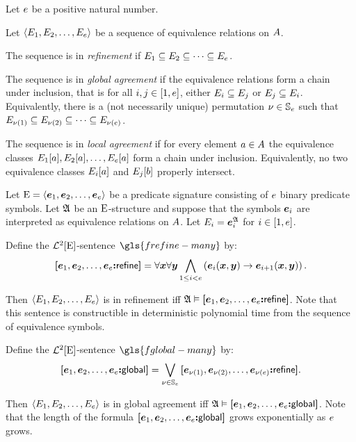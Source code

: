 Let $e$ be a positive natural number.
\begin{definition}
Let $\left\langle E_{1}, E_{2}, \dots, E_{e} \right\rangle$ be a sequence of equivalence
relations on $A$.

The sequence is in \emph{refinement} if $E_{1} \subseteq E_{2} \subseteq
\dots \subseteq E_{e}$.

The sequence is in \emph{global agreement} if the equivalence relations form a
chain under inclusion, that is for all $i, j \in [1, e]$,
either $E_{i} \subseteq E_{j}$ or $E_{j} \subseteq E_{i}$.
Equivalently, there is a (not necessarily unique) permutation
$\nu \in \mathbb{S}_{e}$ such that
$E_{\nu(1)} \subseteq E_{\nu(2)} \subseteq \dots \subseteq
E_{\nu(e)}$.

The sequence is in \emph{local agreement} if for every element $a \in A$
the equivalence classes $E_{1}[a], E_{2}[a], \dots, E_{e}[a]$
form a chain under inclusion.
Equivalently, no two equivalence classes $E_{i}[a]$ and $E_{j}[b]$
properly intersect.
\end{definition}

Let ${\mathrm{E}} = \left\langle \bm{e}_{1}, \bm{e}_{2}, \dots, \bm{e}_{e} \right\rangle$ be a predicate signature
consisting of $e$ binary predicate symbols.
Let $\mathfrak{A}$ be an ${\mathrm{E}}$-structure and suppose that the symbols $\bm{e}_{i}$ are
interpreted as equivalence relations on $A$. Let 
$E_{i} = \bm{e}_{i}^{\mathfrak{A}}$ for $i \in [1,e]$.
\begin{definition}
Define the $\mathcal{L}^{2}[{\mathrm{E}}]$-sentence $\gls{frefine-many}$ by:
\[
  {\bm{[}\bm{e}_{1},\bm{e}_{2},\dots,\bm{e}_{e}\mathord{\bm{:}}\mathsf{refine}\bm{]}} =
  \forall\bm{x}\forall\bm{y} \bigwedge_{1 \leq i < e}
  \left(\bm{e}_{i}(\bm{x},\bm{y}) \rightarrow \bm{e}_{i+1}(\bm{x},\bm{y})\right).
\]
\end{definition}
Then $\left\langle E_{1},E_{2},\dots,E_{e} \right\rangle$ is in refinement iff
$\mathfrak{A} \vDash {\bm{[}\bm{e}_{1},\bm{e}_{2},\dots,\bm{e}_{e}\mathord{\bm{:}}\mathsf{refine}\bm{]}}$.
Note that this sentence is constructible in deterministic polynomial time from
the sequence of equivalence symbols.

\begin{definition}
Define the $\mathcal{L}^{2}[{\mathrm{E}}]$-sentence $\gls{fglobal-many}$ by:
\[
  {\bm{[}\bm{e}_{1},\bm{e}_{2},\dots,\bm{e}_{e}\mathord{\bm{:}}\mathsf{global}\bm{]}} =
  \bigvee_{\nu \in \mathbb{S}_{e}}
  {\bm{[}\bm{e}_{\nu(1)},\bm{e}_{\nu(2)},\dots,\bm{e}_{\nu(e)}\mathord{\bm{:}}\mathsf{refine}\bm{]}}.
\]
\end{definition}
Then $\left\langle E_{1},E_{2},\dots,E_{e} \right\rangle$ is in global agreement iff
$\mathfrak{A} \vDash {\bm{[}\bm{e}_{1},\bm{e}_{2},\dots,\bm{e}_{e}\mathord{\bm{:}}\mathsf{global}\bm{]}}$.
Note that the length of the formula ${\bm{[}\bm{e}_{1},\bm{e}_{2},\dots,\bm{e}_{e}\mathord{\bm{:}}\mathsf{global}\bm{]}}$ grows
exponentially as $e$ grows.

